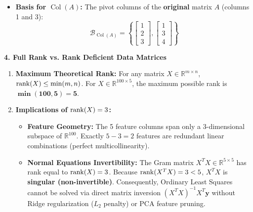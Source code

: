 \begin{enumerate}
\begin{itemize}
\begin{equation*}
        \end{equation*}
        \item \textbf{Basis for $\operatorname{Col}(A)$:} The pivot columns of the \textbf{original} matrix $A$ (columns 1 and 3):
        \begin{equation*}
        \mathcal{B}_{\operatorname{Col}(A)} = \left\{ \begin{bmatrix} 1 \\ 2 \\ 3 \end{bmatrix}, \begin{bmatrix} 1 \\ 3 \\ 4 \end{bmatrix} \right\}
        \end{equation*}
    \end{itemize}
\end{enumerate}

\textbf{4. Full Rank vs. Rank Deficient Data Matrices}
\begin{enumerate}
    \item \textbf{Maximum Theoretical Rank:}
    For any matrix $X \in \mathbb{R}^{m \times n}$, $\operatorname{rank}(X) \le \min(m, n)$.
    For $X \in \mathbb{R}^{100 \times 5}$, the maximum possible rank is $\mathbf{\min(100, 5) = 5}$.
    \item \textbf{Implications of $\operatorname{rank}(X) = 3$:}
    \begin{itemize}
        \item \textbf{Feature Geometry:} The 5 feature columns span only a 3-dimensional subspace of $\mathbb{R}^{100}$. Exactly $5 - 3 = 2$ features are redundant linear combinations (perfect multicollinearity).
        \item \textbf{Normal Equations Invertibility:} The Gram matrix $X^T X \in \mathbb{R}^{5 \times 5}$ has rank equal to $\operatorname{rank}(X) = 3$. Because $\operatorname{rank}(X^T X) = 3 < 5$, $X^T X$ is \textbf{singular (non-invertible)}. Consequently, Ordinary Least Squares cannot be solved via direct matrix inversion $(X^T X)^{-1} X^T \mathbf{y}$ without Ridge regularization ($L_2$ penalty) or PCA feature pruning.
    \end{itemize}
\end{enumerate}

